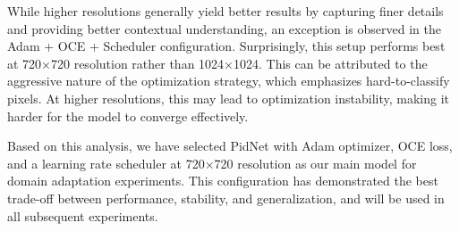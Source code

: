 \documentclass[10pt,twocolumn,letterpaper]{article}
\begin{document}
While higher resolutions generally yield better results by capturing finer details and providing better contextual understanding, an exception is observed in the Adam + OCE + Scheduler configuration. Surprisingly, this setup performs best at 720×720 resolution rather than 1024×1024. This can be attributed to the aggressive nature of the optimization strategy, which emphasizes hard-to-classify pixels. At higher resolutions, this may lead to optimization instability, making it harder for the model to converge effectively.

Based on this analysis, we have selected PidNet with Adam optimizer, OCE loss, and a learning rate scheduler at 720×720 resolution as our main model for domain adaptation experiments. This configuration has demonstrated the best trade-off between performance, stability, and generalization, and will be used in all subsequent experiments.
\end{document}
